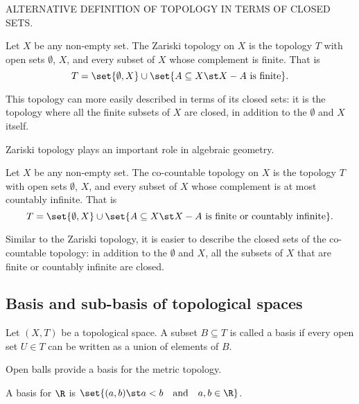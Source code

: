 ALTERNATIVE DEFINITION OF TOPOLOGY IN TERMS OF CLOSED SETS.

\begin{negg}
  Let $X$ be any non-empty set. The Zariski topology on $X$ is the topology $T$ with open sets $\emptyset$, $X$, and every subset of $X$ whose complement is finite. That is
  \begin{equation*}
    T = \set{\emptyset, X} \cup \set{A \subseteq X \st X-A\ \text{is finite}}.
  \end{equation*}

  This topology can more easily described in terms of its closed sets: it is the topology where all the finite subsets of $X$ are closed, in addition to the $\emptyset$ and $X$ itself.

  Zariski topology plays an important role in algebraic geometry.\eggqed
\end{negg}

\begin{negg}
  Let $X$ be any non-empty set. The co-countable topology on $X$ is the topology $T$ with open sets $\emptyset$, $X$, and every subset of $X$ whose complement is at most countably infinite. That is
  \begin{equation*}
    T = \set{\emptyset, X} \cup \set{A \subseteq X \st X-A\ \text{is finite or countably infinite}}.
  \end{equation*}

  Similar to the Zariski topology, it is easier to describe the closed sets of the co-countable topology: in addition to the $\emptyset$ and $X$, all the subsets of $X$ that are finite or countably infinite are closed.
\end{negg}

\subsection{Basis and sub-basis of topological spaces}
\begin{ndfn}
  Let $(X,T)$ be a topological space. A subset $B \subseteq T$ is called a basis if every open set $U \in T$ can be written as a union of elements of $B$.
\end{ndfn}

\begin{negg}
  Open balls provide a basis for the metric topology.
\end{negg}

\begin{negg}
  A basis for $\R$ is $\set{(a,b) \st a<b \quad\text{and}\quad a,b\in\R}$.
\end{negg}

